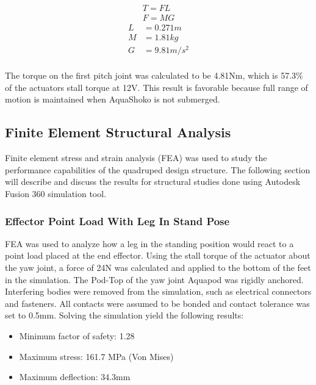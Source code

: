 \begin{align}\label{eq:head-1}
    T = FL   \\
    F = MG
\end{align}
\begin{align*}
    L & = 0.271 m         \\
    M & = 1.81 kg       \\
    G & = 9.81 m/s^2    \\
\end{align*}

The torque on the first pitch joint was calculated to be 4.81Nm, which is 57.3\% of the actuators stall torque at 12V. This result is favorable because full range of motion is maintained when AquaShoko is not submerged.

\subsection{Finite Element Structural Analysis}
Finite element stress and strain analysis (FEA) was used to study the performance capabilities of the quadruped design structure. 
The following section will describe and discuss the results for structural studies done using Autodesk Fusion 360 simulation tool.

\subsubsection{Effector Point Load With Leg In Stand Pose }\label{sub:sub:Leg FEA} %
FEA was used to analyze how a leg in the standing position would react to a point load placed at the end effector. Using the stall torque of the actuator about the yaw joint, a force of 24N was calculated and applied to the bottom of the feet in the simulation. The Pod-Top of the yaw joint Aquapod was rigidly anchored. 
Interfering bodies were removed from the simulation, such as electrical connectors and fasteners. All contacts were assumed to be bonded and contact tolerance was set to 0.5mm.
Solving the simulation yield the following results:
 \begin{itemize}
     \item Minimum factor of safety: 1.28
     \item Maximum stress: 161.7 MPa (Von Mises)
     \item Maximum deflection: 34.3mm
 \end{itemize}




